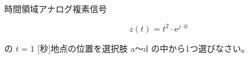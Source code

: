時間領域アナログ複素信号

\[
z(t) = t^2 \cdot \textrm{e}^{j \cdot 0}
\]

\medskip
\noindent の $t = 1$ [秒]地点の位置を選択肢 a〜d の中から1つ選びなさい。
